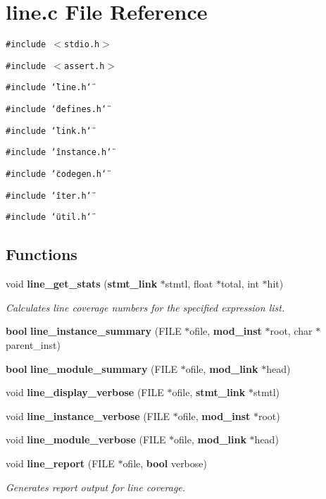 \section{line.c File Reference}
\label{line_8c}
{\tt \#include $<$stdio.h$>$}\par
{\tt \#include $<$assert.h$>$}\par
{\tt \#include \char`\"{}line.h\char`\"{}}\par
{\tt \#include \char`\"{}defines.h\char`\"{}}\par
{\tt \#include \char`\"{}link.h\char`\"{}}\par
{\tt \#include \char`\"{}instance.h\char`\"{}}\par
{\tt \#include \char`\"{}codegen.h\char`\"{}}\par
{\tt \#include \char`\"{}iter.h\char`\"{}}\par
{\tt \#include \char`\"{}util.h\char`\"{}}\par
\subsection*{Functions}
\begin{CompactItemize}
\item 
void {\bf line\_\-get\_\-stats} ({\bf stmt\_\-link} $\ast$stmtl, float $\ast$total, int $\ast$hit)
\begin{CompactList}\small\item\em Calculates line coverage numbers for the specified expression list.\item\end{CompactList}\item 
{\bf bool} {\bf line\_\-instance\_\-summary} (FILE $\ast$ofile, {\bf mod\_\-inst} $\ast$root, char $\ast$parent\_\-inst)
\item 
{\bf bool} {\bf line\_\-module\_\-summary} (FILE $\ast$ofile, {\bf mod\_\-link} $\ast$head)
\item 
void {\bf line\_\-display\_\-verbose} (FILE $\ast$ofile, {\bf stmt\_\-link} $\ast$stmtl)
\item 
void {\bf line\_\-instance\_\-verbose} (FILE $\ast$ofile, {\bf mod\_\-inst} $\ast$root)
\item 
void {\bf line\_\-module\_\-verbose} (FILE $\ast$ofile, {\bf mod\_\-link} $\ast$head)
\item 
void {\bf line\_\-report} (FILE $\ast$ofile, {\bf bool} verbose)
\begin{CompactList}\small\item\em Generates report output for line coverage.\item\end{CompactList}\end{CompactItemize}
